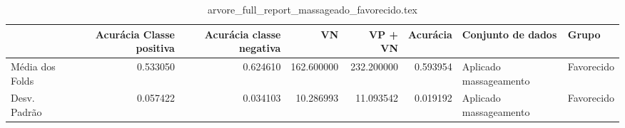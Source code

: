 \begin{table}
\centering
\caption{arvore_full_report_massageado_favorecido.tex}
\label{arvore_full_report_massageado_favorecido.tex}
\begin{tabular}{lrrrrrll}
\toprule
{}              &  Acurácia Classe positiva &  Acurácia classe negativa &         VN  &    VP + VN  &  Acurácia &       Conjunto de dados &       Grupo \\
\midrule
Média dos Folds &                  0.533050 &                  0.624610 &  162.600000 &  232.200000 &  0.593954 &  Aplicado massageamento &  Favorecido \\
Desv. Padrão    &                  0.057422 &                  0.034103 &   10.286993 &   11.093542 &  0.019192 &  Aplicado massageamento &  Favorecido \\
\bottomrule
\end{tabular}
\end{table}
